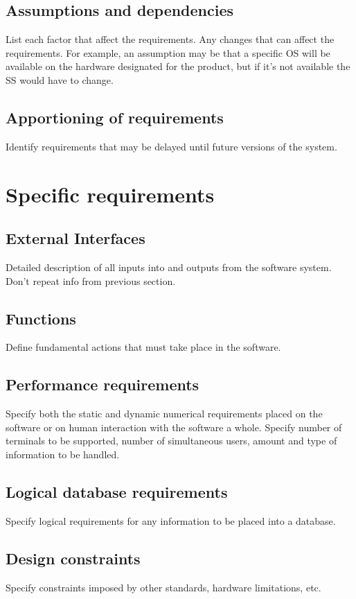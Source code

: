 \documentclass[letterpaper,10pt,draftclsnofoot,onecolumn,titlepage]{IEEEtran}
\begin{document}
	\subsection{Assumptions and dependencies} 
	List each factor that affect the requirements. 
	Any changes that can affect the requirements. 
	For example, an assumption may be that a specific OS will be available on the hardware designated for the product, but if it's not available the SS would have to change.
	
	\subsection{Apportioning of requirements}
	Identify requirements that may be delayed until future versions of the system.
	
	\section{Specific requirements}
	\subsection{External Interfaces}
	Detailed description of all inputs into and outputs from the software system. Don't repeat info from previous section.
	
	\subsection{Functions}
	Define fundamental actions that must take place in the software.
	
	\subsection{Performance requirements}
	Specify both the static and dynamic numerical requirements placed on the software or on human interaction with the software a whole.
	Specify number of terminals to be supported, number of simultaneous users, amount and type of information to be handled. 
	
	\subsection{Logical database requirements}
	Specify logical requirements for any information to be placed into a database.
	
	\subsection{Design constraints}
	Specify constraints imposed by other standards, hardware limitations, etc.
	
\end{document}

